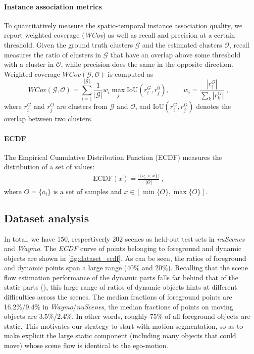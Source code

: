 \paragraph{Instance association metrics}
To quantitatively measure the spatio-temporal instance association quality, we report weighted coverage (\textit{WCov}) as well as recall and precision at a certain threshold. Given the ground truth clusters $\mathcal{G}$ and the estimated clusters $\mathcal{O}$, recall measures the ratio of clusters in $\mathcal{G}$ that have an overlap above some threshold with a cluster in $\mathcal{O}$, while precision does the same in the opposite direction. Weighted coverage $WCov (\mathcal{G},\mathcal{O})$ is computed as
\begin{equation}
    WCov(\mathcal{G}, \mathcal{O}) = \sum_{i=1}^{|\mathcal{G}|} \frac{1}{|\mathcal{G}|} w_i \max_j \mathrm{IoU} (r_i^G, r_j^0), \qquad  w_i = \frac{|r_i^G|}{\sum_k |r_k^G|}\;,
\end{equation}
where $r_i^G$ and $r_j^O$ are clusters from $\mathcal{G}$ and $\mathcal{O}$, and $\mathrm{IoU}(r_i^G, r_j^O)$ denotes the overlap between two clusters. 

\paragraph{ECDF}
The Empirical Cumulative Distribution Function (ECDF) measures the distribution of a set of values:
\begin{equation}
\begin{aligned}
\text{ECDF} (x) = \frac{\big|\{o_i < x\}\big|}{\big|O\big|}\;,
\end{aligned}
\end{equation}
where $O = \{o_i\}$ is a set of samples and $x \in [\min\{O\}, \max\{O\}]$.

\subsection{Dataset analysis}
\label{sec:supp_dataset}


In total, we have 150, respectiverly 202 scenes as held-out test sets in \emph{nuScenes} and \emph{Waymo}. The \textit{ECDF} curve of points belonging to foreground and dynamic objects are shown in \cref{fig:dataset_ecdf}. As can be seen, the ratios of foreground and dynamic points span a large range (40\% and 20\%). Recalling that the scene flow estimation performance of the dynamic parts falls far behind that of the static parts (), this large range of ratios of dynamic objects hints at different difficulties across the scenes. The median fractions of foreground points are 16.2\%/9.4\% in \emph{Waymo}/\emph{nuScenes}, the median fractions of points on moving objects are 3.5\%/2.4\%. In other words, roughly 75\% of all foreground objects are static. This motivates
our strategy to start with motion segmentation, so as to make explicit the large static component (including many objects that could move) whose scene flow is identical to the ego-motion.

